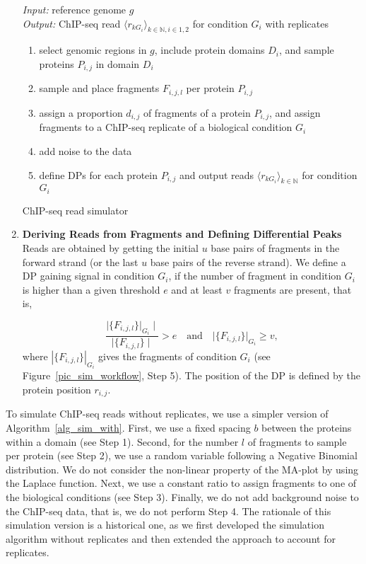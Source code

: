 \begin{enumerate}[label=\hspace{4cm} \arabic*. Step, leftmargin=1.35cm]
\begin{algorithm}[t]
\textit{Input:} reference genome $g$\\
\textit{Output:} ChIP-seq read $\langle r_{kG_i} \rangle_{k \in \mathbb{N}, i \in {1,2}}$ for condition $G_i$ with replicates
  \begin{enumerate}[label=\arabic*.]
    \item select genomic regions in $g$, include protein domains $D_i$, and sample proteins $P_{i,j}$ in domain $D_i$
    \item sample and place fragments $F_{i,j,l}$ per protein $P_{i,j}$
    \item assign a proportion $d_{i,j}$ of fragments of a protein $P_{i,j}$, and assign fragments to a ChIP-seq replicate of a biological condition $G_i$
    \item add noise to the data
    \item define DPs for each protein $P_{i,j}$ and output reads $\langle r_{kG_i} \rangle_{k \in \mathbb{N}}$ for condition $G_i$
  \end{enumerate}
 
 \caption[ChIP-seq read simulator]{ChIP-seq read simulator}
 \label{alg_sim_with}
\end{algorithm}

 \item \textbf{Deriving Reads from Fragments and Defining Differential Peaks}
Reads are obtained by getting the initial $u$ base pairs of fragments in the forward strand (or the last $u$ base pairs of the reverse strand).
We define a DP gaining signal in condition $G_i$, if the number of fragment in condition $G_i$ is higher than a given threshold $e$ and at least $v$ fragments are present, that is,

$$\frac{\mid \{ F_{i,j,l} \} \big |_{G_i} \mid} {\mid \{ F_{i,j,l} \} \mid} > e \quad \text{and} \quad \big |\{ F_{i,j,l} \} \big |_{G_i} \geq v,$$
\noindent
where $|\{F_{i,j,l} \} |_{G_i}$ gives the fragments of condition $G_i$ (see Figure~\ref{pic_sim_workflow}, Step 5).
The position of the DP is defined by the protein position $r_{i, j}$.
\end{enumerate}

To simulate ChIP-seq reads without replicates, we use a simpler version of Algorithm~\ref{alg_sim_with}.
First, we use a fixed spacing $b$ between the proteins within a domain (see Step 1).
Second, for the number $l$ of fragments to sample per protein (see Step 2), we use a random variable following a Negative Binomial distribution. 
We do not consider the non-linear property of the MA-plot by using the Laplace function.
Next, we use a constant ratio to assign fragments to one of the biological conditions (see Step 3).
Finally, we do not add background noise to the ChIP-seq data, that is, we do not perform Step 4.
The rationale of this simulation version is a historical one, as we first developed the simulation algorithm without replicates and then extended the approach to account for replicates.

